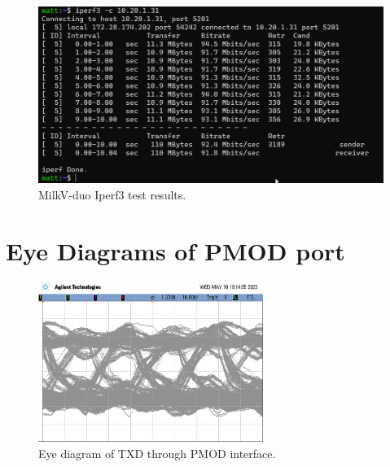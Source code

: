 \begin{figure}[h!]
    \centering
    \includegraphics[width=1\textwidth]{Images/iperf3TestMilkV.png}
    \caption{MilkV-duo Iperf3 test results.}
\end{figure}



\section{Eye Diagrams of PMOD port}
\label{app:eye_diagrams}

\begin{figure}[h]
    \centering
    \includegraphics[width=0.65\textwidth]{Images/EyeDiagramTX.png}
    \caption[Eye diagram of TXD through PMOD interface]{Eye diagram of TXD through PMOD interface.}
    \label{fig:eye_diagram}
\end{figure}
